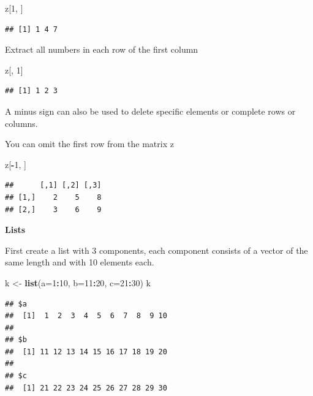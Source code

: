 \documentclass[]{book}
\newenvironment{Shaded}{\begin{snugshade}}{\end{snugshade}}
\newcommand{\KeywordTok}[1]{\textcolor[rgb]{0.13,0.29,0.53}{\textbf{#1}}}
\newcommand{\DataTypeTok}[1]{\textcolor[rgb]{0.13,0.29,0.53}{#1}}
\newcommand{\DecValTok}[1]{\textcolor[rgb]{0.00,0.00,0.81}{#1}}
\newcommand{\StringTok}[1]{\textcolor[rgb]{0.31,0.60,0.02}{#1}}
\newcommand{\OperatorTok}[1]{\textcolor[rgb]{0.81,0.36,0.00}{\textbf{#1}}}
\newcommand{\NormalTok}[1]{#1}
\begin{document}
\begin{Shaded}
\begin{Highlighting}[]
\NormalTok{z[}\DecValTok{1}\NormalTok{, ]}
\end{Highlighting}
\end{Shaded}

\begin{verbatim}
## [1] 1 4 7
\end{verbatim}

Extract all numbers in each row of the first column

\begin{Shaded}
\begin{Highlighting}[]
\NormalTok{z[, }\DecValTok{1}\NormalTok{]}
\end{Highlighting}
\end{Shaded}

\begin{verbatim}
## [1] 1 2 3
\end{verbatim}

A minus sign can also be used to delete specific elements or complete
rows or columns.

You can omit the first row from the matrix z

\begin{Shaded}
\begin{Highlighting}[]
\NormalTok{z[}\OperatorTok{-}\DecValTok{1}\NormalTok{, ]}
\end{Highlighting}
\end{Shaded}

\begin{verbatim}
##      [,1] [,2] [,3]
## [1,]    2    5    8
## [2,]    3    6    9
\end{verbatim}

\textbf{Lists}

First create a list with 3 components, each component consists of a
vector of the same length and with 10 elements each.

\begin{Shaded}
\begin{Highlighting}[]
\NormalTok{k <-}\StringTok{ }\KeywordTok{list}\NormalTok{(}\DataTypeTok{a=}\DecValTok{1}\OperatorTok{:}\DecValTok{10}\NormalTok{, }\DataTypeTok{b=}\DecValTok{11}\OperatorTok{:}\DecValTok{20}\NormalTok{, }\DataTypeTok{c=}\DecValTok{21}\OperatorTok{:}\DecValTok{30}\NormalTok{)}
\NormalTok{k}
\end{Highlighting}
\end{Shaded}

\begin{verbatim}
## $a
##  [1]  1  2  3  4  5  6  7  8  9 10
## 
## $b
##  [1] 11 12 13 14 15 16 17 18 19 20
## 
## $c
##  [1] 21 22 23 24 25 26 27 28 29 30
\end{verbatim}
\end{document}
